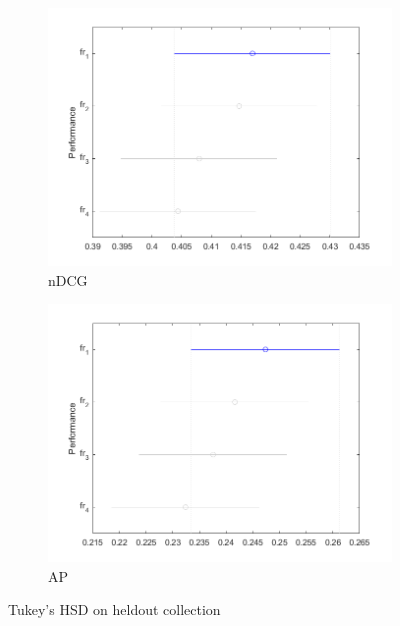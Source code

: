 \begin{figure}[tbp]
     \centering
     \begin{subfigure}[b]{0.45\textwidth}
         \centering
         \includegraphics[width=\textwidth]{figure/heldout-ndcg-hsd.png}
	\caption{\ac{nDCG}}
     \end{subfigure}
     \hfill
     \begin{subfigure}[b]{0.45\textwidth}
         \centering
         \includegraphics[width=\textwidth]{figure/heldout-map-hsd.png}
	\caption{\ac{AP}}
     \end{subfigure}
        \caption{Tukey's \ac{HSD} on heldout collection}
        \label{fig:heldout-hsd}
\end{figure}